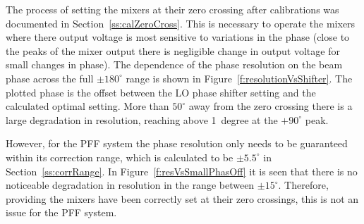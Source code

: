 The process of setting the mixers at their zero crossing after calibrations was documented in Section~\ref{ss:calZeroCross}. This is necessary to operate the mixers where there output voltage is most sensitive to variations in the phase (close to the peaks of the mixer output there is negligible change in output voltage for small changes in phase). The dependence of the phase resolution on the beam phase across the full \(\pm180^\circ\) range is shown in Figure~\ref{f:resolutionVsShifter}. The plotted phase is the offset between the LO phase shifter setting and the calculated optimal setting. More than \(50^\circ\) away from the zero crossing there is a large degradation in resolution, reaching above 1~degree at the \(+90^\circ\) peak.

However, for the PFF system the phase resolution only needs to be guaranteed within its correction range, which is calculated to be \(\pm5.5^\circ\) in Section~\ref{ss:corrRange}. In Figure~\ref{f:resVsSmallPhasOff} it is seen that there is no noticeable degradation in resolution in the range between \(\pm15^\circ\). Therefore, providing the mixers have been correctly set at their zero crossings, this is not an issue for the PFF system.

